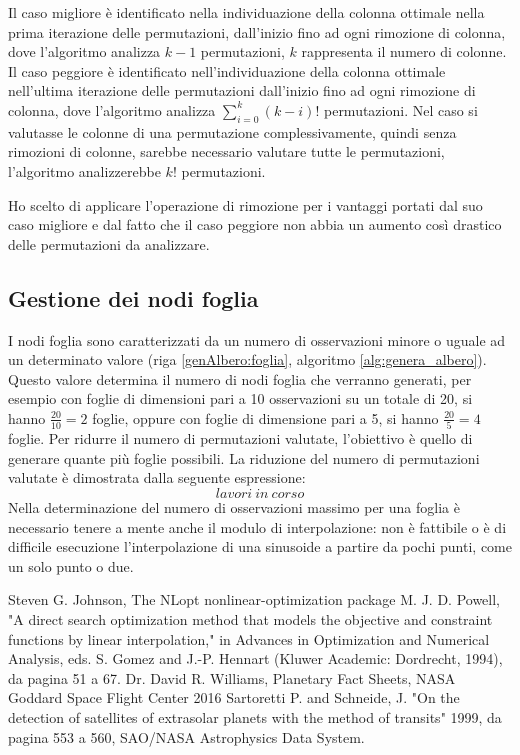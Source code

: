 \documentclass[a4paper,12pt]{report}
\begin{document}
    Il caso migliore è identificato nella individuazione della colonna ottimale nella prima iterazione delle permutazioni, dall'inizio fino ad ogni rimozione di colonna, dove l'algoritmo analizza $k-1$ permutazioni, $k$ rappresenta il numero di colonne. Il caso peggiore è identificato nell'individuazione della colonna ottimale nell'ultima iterazione delle permutazioni dall'inizio fino ad ogni rimozione di colonna, dove l'algoritmo analizza  $\sum_{i=0}^k (k-i)!$ permutazioni.
    Nel caso si valutasse le colonne di una permutazione complessivamente, quindi senza rimozioni di colonne, sarebbe necessario valutare tutte le permutazioni, l'algoritmo analizzerebbe $k!$ permutazioni.

    Ho scelto di applicare l'operazione di rimozione per i vantaggi portati dal suo caso migliore e dal fatto che il caso peggiore non abbia un aumento così drastico delle permutazioni da analizzare.


  \subsection{Gestione dei nodi foglia}
  I nodi foglia sono caratterizzati da un numero di osservazioni minore o uguale ad un determinato valore (riga \ref{genAlbero:foglia}, algoritmo \ref{alg:genera_albero}). Questo valore determina il numero di nodi foglia che verranno generati, per esempio con foglie di dimensioni pari a 10 osservazioni su un totale di 20, si hanno $\frac{20}{10} = 2$ foglie, oppure con foglie di dimensione pari a 5, si hanno $\frac{20}{5} = 4$ foglie. Per ridurre il numero di permutazioni valutate, l'obiettivo è quello di generare quante più foglie possibili. La riduzione del numero di permutazioni valutate è dimostrata dalla seguente espressione:
  \begin{equation}
    lavori~in~corso
  \end{equation}
  Nella determinazione del numero di osservazioni massimo per una foglia è necessario tenere a mente anche il modulo di interpolazione: non è fattibile o è di difficile esecuzione l'interpolazione di una sinusoide a partire da pochi punti, come un solo punto o due.


%
%
\begin{thebibliography}{00}
Steven G. Johnson, The NLopt nonlinear-optimization package
%
M. J. D. Powell, "A direct search optimization method that models the objective and constraint functions by linear interpolation," in Advances in Optimization and Numerical Analysis, eds. S. Gomez and J.-P. Hennart (Kluwer Academic: Dordrecht, 1994), da pagina 51 a 67.
%
Dr. David R. Williams, Planetary Fact Sheets, NASA Goddard Space Flight Center 2016
%
Sartoretti P. and Schneide, J. "On the detection of satellites of extrasolar planets with the method of transits" 1999, da pagina 553 a 560, SAO/NASA Astrophysics Data System.

\end{thebibliography}

%
\end{document}
